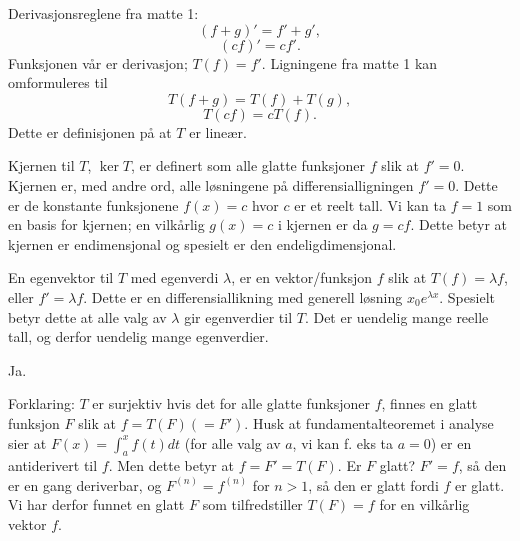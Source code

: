 \begin{losning}

\begin{punkt}
Derivasjonsreglene fra matte 1: 
$$(f+g)'=f'+g',$$ $$(cf)'=cf'.$$ Funksjonen vår er derivasjon; $T(f)=f'$. Ligningene fra matte 1 kan omformuleres til $$T(f+g)=T(f)+T(g),$$ $$T(cf)=cT(f).$$ Dette er definisjonen på at $T$ er lineær.
\end{punkt}

\begin{punkt}
Kjernen til $T$, $\ker T$, er definert som alle glatte funksjoner $f$ slik at $f'=0$. Kjernen er, med andre ord, alle løsningene på differensialligningen $f'=0$. Dette er de konstante funksjonene $f(x)=c$ hvor $c$ er et reelt tall. Vi kan ta $f=1$ som en basis for kjernen; en vilkårlig $g(x)=c$ i kjernen er da $g=cf$. Dette betyr at kjernen er endimensjonal og spesielt er den endeligdimensjonal.
\end{punkt}

\begin{punkt}
En egenvektor til $T$ med egenverdi $\lambda$, er en vektor/funksjon $f$ slik at $T(f)=\lambda f$, eller $f'=\lambda f$. Dette er en differensiallikning med generell løsning $x_0e^{\lambda x}$. Spesielt betyr dette at alle valg av $\lambda$ gir egenverdier til $T$. Det er uendelig mange reelle tall, og derfor uendelig mange egenverdier.
\end{punkt}

\begin{punkt}
Ja.

\noindent
Forklaring: $T$ er surjektiv hvis det for alle glatte funksjoner $f$, finnes en glatt funksjon $F$ slik at $f=T(F)(=F')$. Husk at fundamentalteoremet i analyse sier at $F(x)=\int_a^x f(t)dt$ (for alle valg av $a$, vi kan f. eks ta $a=0$) er en antiderivert til $f$. Men dette betyr at $f=F'=T(F)$. Er $F$ glatt? $F'=f$, så den er en gang deriverbar, og $F^{(n)}=f^{(n)}$ for $n>1$, så den er glatt fordi $f$ er glatt. Vi har derfor funnet en glatt $F$ som tilfredstiller $T(F)=f$ for en vilkårlig vektor $f$.
\end{punkt}

\end{losning}
